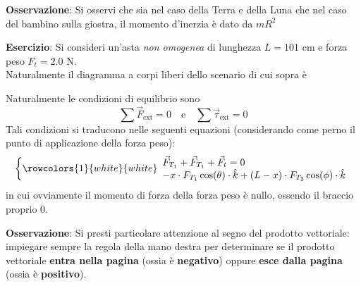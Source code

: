\documentclass[a4paper]{extarticle}
\begin{document}
\vspace{1em}
\noindent
\textbf{Osservazione}: Si osservi che sia nel caso della Terra e della Luna che nel caso del bambino sulla giostra, il momento d'inerzia è dato da $m R^2$

\vspace{1em}
\noindent
\textbf{Esercizio}: Si consideri un'asta \emph{non omogenea} di lunghezza $L=101$ cm e forza peso $F_t=2.0$ N.\\
Naturalmente il diagramma a corpi liberi dello scenario di cui sopra è

\begin{figure}[H]
  \centering
  \caption{}
  \label{}
\end{figure}

\noindent
Naturalmente le condizioni di equilibrio sono
\[\sum \vec F_{\text{ext}} = 0 \hspace{1em} \text{e} \hspace{1em} \sum \vec \tau_{\text{ext}} = 0\]
Tali condizioni si traducono nelle seguenti equazioni (considerando come perno il punto di applicazione della forza peso):
\[
  \left\{
  \rowcolors{1}{white}{white}
  \begin{array}{l}
    \vec F_{T_1} + \vec F_{T_1} + \vec F_t = 0\\
    -x \cdot F_{T_1} \cos(\theta) \cdot \hat{k} + (L-x) \cdot F_{T_2} \cos(\phi) \cdot \hat{k}\\
  \end{array}
  \right.
\]
in cui ovviamente il momento di forza della forza peso è nullo, essendo il braccio proprio $0$.

\vspace{1em}
\noindent
\textbf{Osservazione}: Si presti particolare attenzione al segno del prodotto vettoriale: impiegare sempre la regola della mano destra per determinare se il prodotto vettoriale \textbf{entra nella pagina} (ossia è \textbf{negativo}) oppure \textbf{esce dalla pagina} (ossia è \textbf{positivo}).
\end{document}
